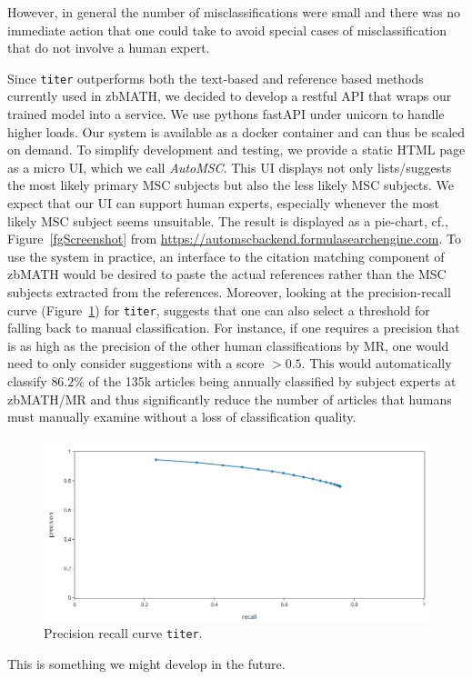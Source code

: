 However, in general the number of misclassifications were small and there was no immediate action that one could take to avoid special cases of misclassification that do not involve a human expert.

Since \texttt{titer} outperforms both the text-based and reference based methods currently used in zbMATH, we decided to develop a restful API that wraps our trained model into a service.
We use pythons fastAPI under unicorn to handle higher loads.
Our system is available as a docker container and can thus be scaled on demand.
To simplify development and testing, we provide a static HTML page as a micro UI, which we call \emph{AutoMSC}.
This UI displays not only lists/suggests the most likely primary MSC subjects but also the less likely MSC subjects.
We expect that our UI can support human experts, especially whenever the most likely MSC subject seems unsuitable.
The result is displayed as a pie-chart, cf., Figure~\ref{fgScreenshot} from \url{https://automscbackend.formulasearchengine.com}.
To use the system in practice, an interface to the citation matching component of zbMATH would be desired to paste the actual references rather than the MSC subjects extracted from the references.
Moreover, looking at the precision-recall curve (Figure~\ref{fgPR}) for \texttt{titer}, suggests that one can also select a threshold for falling back to manual classification.
For instance, if one requires a precision that is as high as the precision of the other human classifications by MR, one would need to only consider suggestions with a score \(> 0.5\).
This would automatically classify \(86.2\%\) of the 135k articles being annually classified by subject experts at zbMATH/MR and thus significantly reduce the number of articles that humans must manually examine without a loss of classification quality.

\begin{figure}[t]
  \centering
  \includegraphics[width=.7\textwidth]{prcurve.png}
  \caption{Precision recall curve \texttt{titer}.}
  \label{fgPR}
\end{figure}
This is something we might develop in the future.


